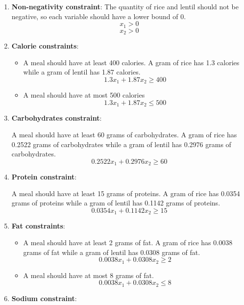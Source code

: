 \documentclass[
]{article}
\begin{document}
\begin{enumerate}
	\item \textbf{Non-negativity constraint}:
	      The quantity of rice and lentil should not be negative, so each variable should have a lower bound of 0.
	      \begin{equation}
	      	x_1 > 0
	      \end{equation}
	      \begin{equation}
	      	x_2 > 0
	      \end{equation}
	\item \textbf{Calorie constraints}: 
	      \begin{itemize}
	      	\item A meal should have at least 400 calories.
	      	      A gram of rice has 1.3 calories while a gram of lentil has 1.87 calories.
	      	      \begin{equation}
	      	      	1.3x_1 + 1.87x_2 \ge 400
	      	      \end{equation}
	      	\item A meal should have at most 500 calories
	      	      \begin{equation}
	      	      	1.3x_1 + 1.87x_2 \le 500
	      	      \end{equation}
	      \end{itemize}
	\item \textbf{Carbohydrates constraint}:
	      	      
	      A meal should have at least 60 grams of carbohydrates. A gram of rice has 0.2522 grams of carbohydrates while a gram of lentil has 0.2976 grams of carbohydrates.
	      \begin{equation}
	      	0.2522x_1 + 0.2976x_2 \ge 60
	      \end{equation}
	\item \textbf{Protein constraint}:
	      	      
	      A meal should have at least 15 grams of proteins. A gram of rice has 0.0354 grams of proteins while a gram of lentil has 0.1142 grams of proteins.
	      \begin{equation}
	      	0.0354x_1 + 0.1142x_2 \ge 15
	      \end{equation}
	\item \textbf{Fat constraints}: 
	      \begin{itemize}
	      	\item A meal should have at least 2 grams of fat.
	      	      A gram of rice has 0.0038 grams of fat while a gram of lentil has 0.0308 grams of fat.
	      	      \begin{equation}
	      	      	0.0038x_1 + 0.0308x_2 \ge 2
	      	      \end{equation}
	      	\item A meal should have at most 8 grams of fat.
	      	      \begin{equation}
	      	      	0.0038x_1 + 0.0308x_2 \le 8
	      	      \end{equation}
	      \end{itemize}
	\item \textbf{Sodium constraint}:
	      	      

\end{enumerate}
\end{document}
